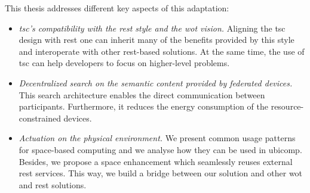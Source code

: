 This thesis addresses different key aspects of this adaptation:
\begin{itemize}
  \item \emph{\ac{tsc}'s compatibility with the \acs{rest} style and the \ac{wot} vision.}
	Aligning the \ac{tsc} design with \ac{rest} one can inherit many of the benefits provided by this style and interoperate with other \ac{rest}-based solutions.
	At the same time, the use of \ac{tsc} can help developers to focus on higher-level problems.
	
  \item \emph{Decentralized search on the semantic content provided by federated devices.}
	This search architecture enables the direct communication between participants.
	Furthermore, it reduces the energy consumption of the resource-constrained devices.
	
  \item \emph{Actuation on the physical environment.}
	We present common usage patterns for space-based computing and we analyse how they can be used in \ac{ubicomp}.
	Besides, we propose a space enhancement which seamlessly reuses external \ac{rest} services.
	This way, we build a bridge between our solution and other \ac{wot} and \ac{rest} solutions.
\end{itemize}
